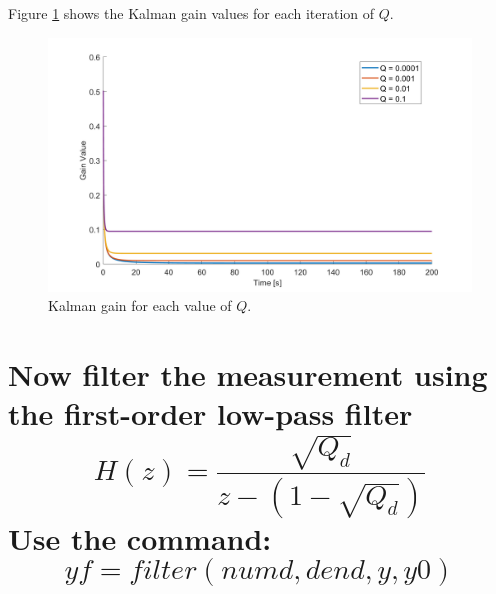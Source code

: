 \documentclass[12pt,letterpaper, onecolumn]{exam}
\begin{document}
\begin{questions}
\begin{parts}
{            Figure \ref{fig:7} shows the Kalman gain values for each iteration of $Q$.

            \begin{figure}[!h]
                \centering
                \includegraphics[width=\linewidth]{Q2b_gains.png}
                \caption{Kalman gain for each value of $Q$.}
                \label{fig:7}
            \end{figure}
        }
        \clearpage

        \part{Now filter the measurement using the first-order low-pass filter
            \[H(z)=  \frac{\sqrt{Q_d}}{z - \left(1 - \sqrt{Q_d}\right)} \]
            Use the command:
            \[yf = filter(numd,dend,y,y0)\]}

        \clearpage

\end{parts}
\end{questions}
\end{document}
